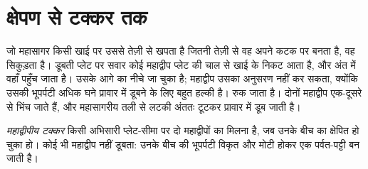 \section{क्षेपण से टक्कर तक}

जो महासागर किसी खाई पर उससे तेज़ी से खपता है जितनी तेज़ी से वह अपने कटक पर बनता है, वह
सिकुड़ता है। डूबती प्लेट पर सवार कोई महाद्वीप प्लेट की चाल से खाई के
निकट आता है, और अंत में वहाँ पहुँच जाता है। उसके आगे का  नीचे जा चुका है; महाद्वीप उसका अनुसरण नहीं कर सकता,
क्योंकि उसकी भूपर्पटी अधिक घने प्रावार में डूबने के लिए बहुत हल्की है। 
रुक जाता है। दोनों महाद्वीप एक-दूसरे से भिंच जाते हैं, और महासागरीय तली से लटकी
 अंततः टूटकर प्रावार में
डूब जाती है।

\begin{definition}[महाद्वीपीय टक्कर]\label{def:g12:mountain-building:collision}
\emph{महाद्वीपीय टक्कर} किसी अभिसारी प्लेट-सीमा पर
दो महाद्वीपों का मिलना है, जब उनके बीच का 
क्षेपित हो चुका हो। कोई भी महाद्वीप नहीं डूबता: उनके बीच की भूपर्पटी
विकृत और मोटी होकर एक पर्वत-पट्टी बन जाती है।
\end{definition}

